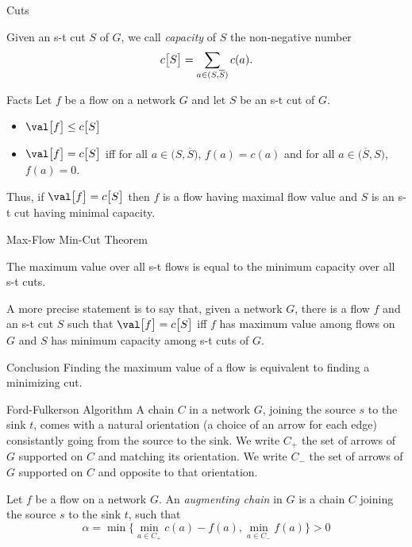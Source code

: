 \documentclass[32pt, aspectratio=169]{beamer}
\begin{document}
\begin{frame}{Cuts}
  \begin{defn}
    Given an s-t cut $S$ of $G$, we call \emph{capacity} of $S$ the
    non-negative number
    \begin{displaymath}
      c\big[S\big] = \sum_{a \in (S, \smash{\overline{S}})} c(a).
    \end{displaymath}
  \end{defn}
  \begin{halfshyblock}{Facts}
    Let $f$ be a flow on a network $G$ and let $S$ be an s-t cut of
    $G$.
    \begin{itemize}
      \item $\val\big[f\big] \leq c\big[S\big]$
      \item $\val\big[f\big] = c\big[S\big]$ iff for all
        $a \in \big(S, \overline{S}\big)$, $f(a) = c(a)$ and for all
        $a \in \big(\overline{S}, S\big)$, $f(a) = 0$.
    \end{itemize}
  \end{halfshyblock}
  Thus, if $\val\big[f\big] = c\big[S\big]$ then $f$ is a flow having
  maximal flow value and $S$ is an s-t cut having minimal capacity.
\end{frame}
\begin{frame}{Max-Flow Min-Cut Theorem}
\begin{thm}
    The maximum value over all s-t flows is equal to the minimum
    capacity over all s-t cuts.
  \end{thm}
  \pause
  A more precise statement is to say that, given a network $G$, there
  is a flow $f$ and an s-t cut $S$ such that
  $\val\big[f\big] = c\big[S\big]$ iff $f$ has maximum value among
  flows on $G$ and $S$ has minimum capacity among s-t cuts of $G$.
  \pause
  \begin{halfshyblock}{Conclusion}
    Finding the maximum value of a flow is equivalent to finding a
    minimizing cut.
  \end{halfshyblock}
\end{frame}

\begin{frame}{Ford-Fulkerson Algorithm}
  A chain $C$ in a network $G$, joining the source $s$ to the sink
  $t$, comes with a natural orientation (a choice of an arrow for each
  edge) consistantly going from the source to the sink. We write $C_+$
  the set of arrows of $G$ supported on $C$ and matching its
  orientation. We write $C_-$ the set of arrows of $G$ supported on
  $C$ and opposite to that orientation.  \pause
  \begin{defn}
    Let $f$ be a flow on a network $G$. An \emph{augmenting chain} in $G$ is a chain
    $C$ joining the source $s$ to the sink $t$, such that
    \begin{displaymath}
      \alpha = \min\Big\{\min_{a \in C_+}c(a)-f(a), \min_{a \in C_-}f(a)\Big\} > 0
    \end{displaymath}
  \end{defn}
\end{frame}
\end{document}
